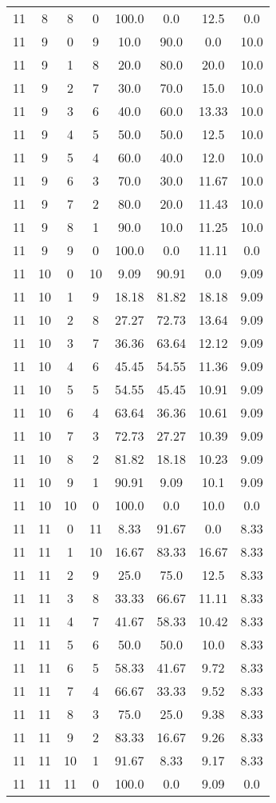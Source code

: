 \documentclass[9pt]{article}
\begin{document}
\begin{table}[h]
\begin{threeparttable}
\begin{tabular}{cccccccc}
11 & 8 & 8 & 0 & 100.0 & 0.0 & 12.5 & 0.0 \\
11 & 9 & 0 & 9 & 10.0 & 90.0 & 0.0 & 10.0 \\
11 & 9 & 1 & 8 & 20.0 & 80.0 & 20.0 & 10.0 \\
11 & 9 & 2 & 7 & 30.0 & 70.0 & 15.0 & 10.0 \\
11 & 9 & 3 & 6 & 40.0 & 60.0 & 13.33 & 10.0 \\
11 & 9 & 4 & 5 & 50.0 & 50.0 & 12.5 & 10.0 \\
11 & 9 & 5 & 4 & 60.0 & 40.0 & 12.0 & 10.0 \\
11 & 9 & 6 & 3 & 70.0 & 30.0 & 11.67 & 10.0 \\
11 & 9 & 7 & 2 & 80.0 & 20.0 & 11.43 & 10.0 \\
11 & 9 & 8 & 1 & 90.0 & 10.0 & 11.25 & 10.0 \\
11 & 9 & 9 & 0 & 100.0 & 0.0 & 11.11 & 0.0 \\
11 & 10 & 0 & 10 & 9.09 & 90.91 & 0.0 & 9.09 \\
11 & 10 & 1 & 9 & 18.18 & 81.82 & 18.18 & 9.09 \\
11 & 10 & 2 & 8 & 27.27 & 72.73 & 13.64 & 9.09 \\
11 & 10 & 3 & 7 & 36.36 & 63.64 & 12.12 & 9.09 \\
11 & 10 & 4 & 6 & 45.45 & 54.55 & 11.36 & 9.09 \\
11 & 10 & 5 & 5 & 54.55 & 45.45 & 10.91 & 9.09 \\
11 & 10 & 6 & 4 & 63.64 & 36.36 & 10.61 & 9.09 \\
11 & 10 & 7 & 3 & 72.73 & 27.27 & 10.39 & 9.09 \\
11 & 10 & 8 & 2 & 81.82 & 18.18 & 10.23 & 9.09 \\
11 & 10 & 9 & 1 & 90.91 & 9.09 & 10.1 & 9.09 \\
11 & 10 & 10 & 0 & 100.0 & 0.0 & 10.0 & 0.0 \\
11 & 11 & 0 & 11 & 8.33 & 91.67 & 0.0 & 8.33 \\
11 & 11 & 1 & 10 & 16.67 & 83.33 & 16.67 & 8.33 \\
11 & 11 & 2 & 9 & 25.0 & 75.0 & 12.5 & 8.33 \\
11 & 11 & 3 & 8 & 33.33 & 66.67 & 11.11 & 8.33 \\
11 & 11 & 4 & 7 & 41.67 & 58.33 & 10.42 & 8.33 \\
11 & 11 & 5 & 6 & 50.0 & 50.0 & 10.0 & 8.33 \\
11 & 11 & 6 & 5 & 58.33 & 41.67 & 9.72 & 8.33 \\
11 & 11 & 7 & 4 & 66.67 & 33.33 & 9.52 & 8.33 \\
11 & 11 & 8 & 3 & 75.0 & 25.0 & 9.38 & 8.33 \\
11 & 11 & 9 & 2 & 83.33 & 16.67 & 9.26 & 8.33 \\
11 & 11 & 10 & 1 & 91.67 & 8.33 & 9.17 & 8.33 \\
11 & 11 & 11 & 0 & 100.0 & 0.0 & 9.09 & 0.0 \\


\end{tabular}
\end{threeparttable}
\end{table}
\end{document}
